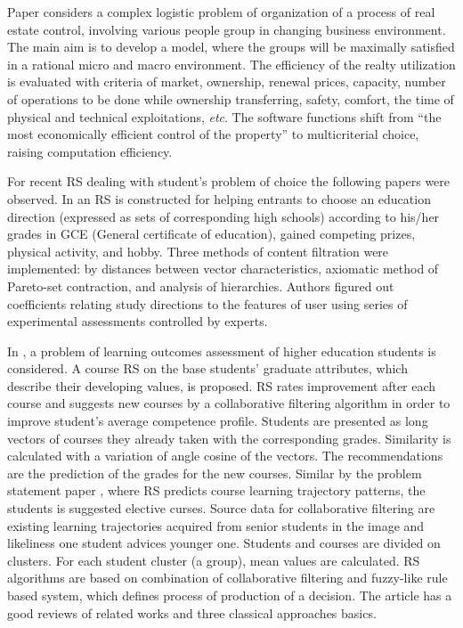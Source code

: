 \documentclass[conference,a4]{IEEEtran}
\begin{document}
Paper \cite{br21} considers a complex logistic problem of organization of a process of real estate control, involving various people group in changing business environment.  The main aim is to develop a model, where the groups will be maximally satisfied in a rational micro and macro environment.  The efficiency of the realty utilization is evaluated with criteria of market, ownership, renewal prices, capacity, number of operations to be done while ownership transferring, safety, comfort, the time of physical and technical exploitations, \emph{etc}.  The software functions shift from ``the most economically efficient control of the property'' to multicriterial choice, raising computation efficiency.


For recent RS dealing with student's problem of choice the following papers were observed. In \cite{belotsky} an RS is constructed for helping entrants to choose an education direction (expressed as sets of corresponding high schools) according to his/her grades in GCE (General certificate of education), gained competing prizes, physical activity, and hobby.  Three methods of content filtration were implemented: by distances between vector characteristics, axiomatic method of Pareto-set contraction, and analysis of hierarchies.  Authors figured out coefficients relating study directions to the features of user using series of experimental assessments controlled by experts.

In \cite{bakh}, a problem of learning outcomes assessment of higher education students is considered.  A course RS on the base students' graduate attributes, which describe their developing values, is proposed.  RS rates improvement after each course and suggests new courses by a collaborative filtering algorithm in order to improve student's average competence profile.  Students are presented as long vectors of courses they already taken with the corresponding grades.  Similarity is calculated with a variation of angle cosine of the vectors.  The recommendations are the prediction of the grades for the new courses.  Similar by the problem statement paper \cite{amer}, where RS predicts course learning trajectory patterns, the students is suggested elective curses.  Source data for collaborative filtering are existing learning trajectories acquired from senior students in the image and likeliness one student advices younger one. Students and courses are divided on clusters.  For each student cluster (a group), mean values are calculated.  RS algorithms are based on combination of collaborative filtering and fuzzy-like rule based system, which defines process of production of a decision.  The article has a good reviews of related works and three classical approaches basics.
\end{document}
